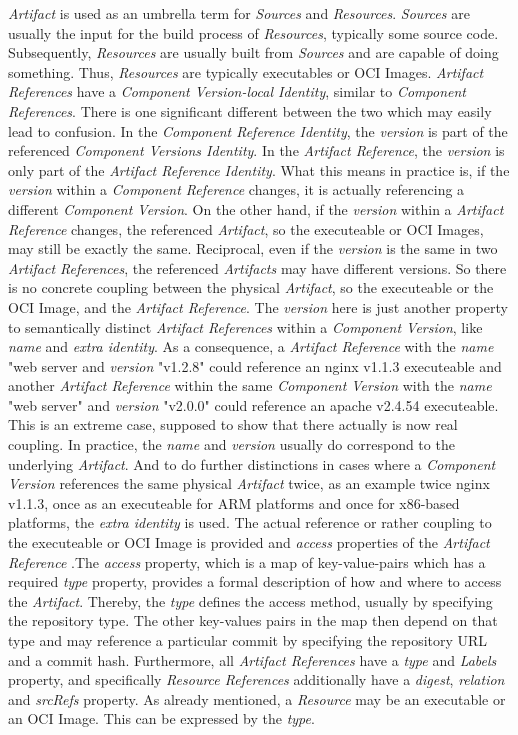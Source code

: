 \noindent \emph{Artifact} is used as an umbrella term for \emph{Sources} and \emph{Resources}. \emph{Sources} are usually the input for the build process of \emph{Resources}, typically some source code. Subsequently, \emph{Resources} are usually built from \emph{Sources} and are capable of doing something. Thus, \emph{Resources} are typically executables or OCI Images. \emph{Artifact References} have a \emph{Component Version-local Identity}, similar to \emph{Component References}. There is one significant different between the two which may easily lead to confusion. In the \emph{Component Reference Identity}, the \emph{version} is part of the referenced \emph{Component Versions Identity}. In the \emph{Artifact Reference}, the \emph{version} is only part of the \emph{Artifact Reference Identity}. What this means in practice is, if the \emph{version} within a \emph{Component Reference} changes, it is actually referencing a different \emph{Component Version}. On the other hand, if the \emph{version} within a \emph{Artifact Reference} changes, the referenced \emph{Artifact}, so the executeable or OCI Images, may still be exactly the same. Reciprocal, even if the \emph{version} is the same in two \emph{Artifact References}, the referenced \emph{Artifacts} may have different versions. So there is no concrete coupling between the physical \emph{Artifact}, so the executeable or the OCI Image, and the \emph{Artifact Reference}. The \emph{version} here is just another property to semantically distinct \emph{Artifact References} within a \emph{Component Version}, like \emph{name} and \emph{extra identity}. As a consequence, a \emph{Artifact Reference} with the \emph{name} "web server and \emph{version} "v1.2.8" could reference an nginx v1.1.3 executeable and another \emph{Artifact Reference} within the same \emph{Component Version} with the \emph{name} "web server" and \emph{version} "v2.0.0" could reference an apache v2.4.54 executeable. This is an extreme case, supposed to show that there actually is now real coupling. In practice, the \emph{name} and \emph{version} usually do correspond to the underlying \emph{Artifact}. And to do further distinctions in cases where a \emph{Component Version} references the same physical \emph{Artifact} twice, as an example twice nginx v1.1.3, once as an executeable for ARM platforms and once for x86-based platforms, the \emph{extra identity} is used. The actual reference or rather coupling to the executeable or OCI Image is provided and \emph{access} properties of the \emph{Artifact Reference} .The \emph{access} property, which is a map of key-value-pairs which has a required \emph{type} property, provides a formal description of how and where to access the \emph{Artifact}. Thereby, the \emph{type} defines the access method, usually by specifying the repository type. The other key-values pairs in the map then depend on that type and may reference a particular commit by specifying the repository URL and a commit hash. Furthermore, all \emph{Artifact References} have a \emph{type} and \emph{Labels} property, and specifically \emph{Resource References} additionally have a \emph{digest}, \emph{relation} and \emph{srcRefs} property. As already mentioned, a \emph{Resource} may be an executable or an OCI Image. This can be expressed by the \emph{type}. 